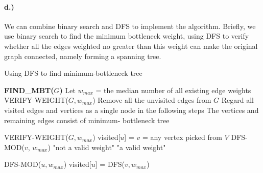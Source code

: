 \documentclass[a4paper,12pt]{article}
\begin{document}
\paragraph*{d.)} We can combine binary search and DFS to implement
the algorithm. Briefly, we use binary search to find the minimum 
bottleneck weight, using DFS to verify whether all the edges weighted 
no greater than this weight can make the original graph connected,
namely forming a spanning tree. 

\begin{algorithm}
\caption{Using DFS to find minimum-bottleneck tree}
\begin{algorithmic}
\STATE \textbf{FIND\_MBT($G$)}
\STATE Let $w_{max}$ = the median number of all existing edge 
weights
\STATE VERIFY-WEIGHT($G, w_{max}$)
\STATE Remove all the unvisited edges from $G$
\ELSE Regard all visited edges and vertices as a single node in the
following steps
\ENDIF
\ENDWHILE
\STATE The vertices and remaining edges consist of minimum-
bottleneck tree
\end{algorithmic}
\end{algorithm}

\begin{algorithm}
\begin{algorithmic}
\STATE VERIFY-WEIGHT($G, w_{max}$)
    \STATE visited[$u$] = \FALSE
\ENDFOR
\STATE $v$ = any vertex picked from $V$
\STATE DFS-MOD($v$, $w_{max}$)
        \RETURN "not a valid weight"
        \ELSE \RETURN "a valid weight"
    \ENDIF
\ENDFOR
\end{algorithmic}
\end{algorithm}

\begin{algorithm}
\begin{algorithmic}
\STATE DFS-MOD($u, w_{max}$)
\STATE visited[$u$] = \TRUE
{}
\STATE DFS($v, w_{max}$)
\ENDIF
\ENDFOR
\end{algorithmic}
\end{algorithm}
\end{document}
